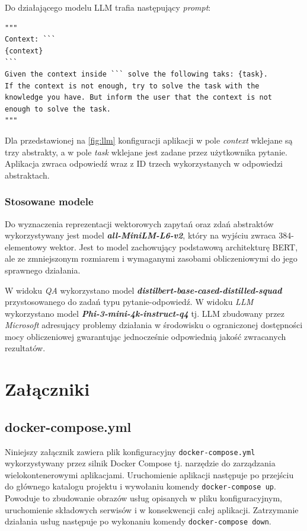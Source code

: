 \documentclass[10pt]{article}
\begin{document}
Do działającego modelu LLM trafia następujący \textit{prompt}:

\begin{lstlisting}
"""
Context: ```
{context}
```
Given the context inside ``` solve the following taks: {task}.
If the context is not enough, try to solve the task with the
knowledge you have. But inform the user that the context is not
enough to solve the task.
"""
\end{lstlisting}

Dla przedstawionej na \ref{fig:llm} konfiguracji aplikacji w pole \textit{context} wklejane są trzy abstrakty, a w pole \textit{task} wklejane jest zadane przez użytkownika pytanie. Aplikacja zwraca odpowiedź wraz z ID trzech wykorzystanych w odpowiedzi abstraktach.

\subsubsection{Stosowane modele}

Do wyznaczenia reprezentacji wektorowych zapytań oraz zdań abstraktów wykorzystywany jest model \textbf{\textit{all-MiniLM-L6-v2}}, który na wyjściu zwraca 384-elementowy wektor. Jest to model zachowujący podstawową architekturę BERT, ale ze zmniejszonym rozmiarem i wymaganymi zasobami obliczeniowymi do jego sprawnego działania. 

W widoku \emph{QA} wykorzystano model \emph{\textbf{distilbert-base-cased-distilled-squad}} przystosowanego do zadań typu pytanie-odpowiedź. W widoku \emph{LLM} wykorzystano model \emph{\textbf{Phi-3-mini-4k-instruct-q4}} tj. LLM zbudowany przez \textit{Microsoft} adresujący problemy działania w środowisku o ograniczonej dostępności mocy obliczeniowej gwarantując jednocześnie odpowiednią jakość zwracanych rezultatów.


\section{Załączniki}

\subsection{docker-compose.yml}
\label{s:docker-compose.yml}

Niniejszy załącznik zawiera plik konfiguracyjny \texttt{docker-compose.yml} wykorzystywany przez silnik Docker Compose tj. narzędzie do zarządzania wielokontenerowymi aplikacjami. Uruchomienie aplikacji następuje po przejściu do głównego katalogu projektu i wywołaniu komendy \texttt{docker-compose up}. Powoduje to zbudowanie obrazów usług opisanych w pliku konfiguracyjnym, uruchomienie składowych serwisów i w konsekwencji całej aplikacji. Zatrzymanie działania usług następuje po wykonaniu komendy \texttt{docker-compose down}.
\end{document}
